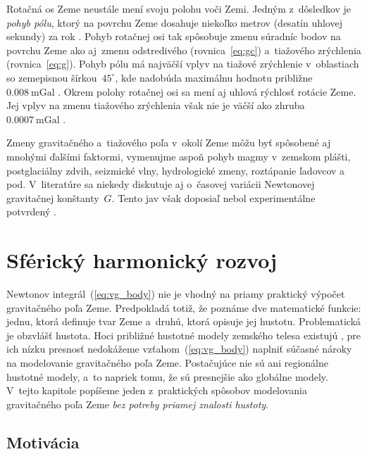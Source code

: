 \documentclass[a4paper, 12pt]{book}
\begin{document}
Rotačná os Zeme neustále mení svoju polohu voči Zemi.  Jedným z~dôsledkov je 
\emph{pohyb pólu}, ktorý na povrchu Zeme dosahuje niekoľko metrov (desatín 
uhlovej sekundy) za rok \parencite{MoritzPhysicalGeodesy}.  Pohyb rotačnej osi 
tak spôsobuje zmenu súradníc bodov na povrchu Zeme ako aj~zmenu odstredivého 
(rovnica~\ref{eq:gc}) a~tiažového zrýchlenia (rovnica~\ref{eq:g}).  Pohyb pólu 
má najväčší vplyv na tiažové zrýchlenie v~oblastiach so zemepisnou 
šírkou~$45^{\circ}$, kde nadobúda maximálnu hodnotu približne~$0.008\ 
\mathrm{mGal}$ \parencite{Torge1989}.  Okrem polohy rotačnej osi sa mení aj 
uhlová rýchlosť rotácie Zeme.  Jej vplyv na zmenu tiažového zrýchlenia však nie 
je väčší ako zhruba~$0.0007\ \mathrm{mGal}$ \parencite{Torge1989}.

Zmeny gravitačného a~tiažového poľa v~okolí Zeme môžu byť spôsobené aj mnohými 
ďalšími faktormi, vymenujme aspoň pohyb magmy v~zemskom plášti, postglaciálny 
zdvih, seizmické vlny, hydrologické zmeny, roztápanie ľadovcov a pod.  
V~literatúre sa niekedy diskutuje aj o~časovej variácii Newtonovej gravitačnej 
konštanty~$G$.  Tento jav však doposiaľ nebol experimentálne potvrdený 
\parencite{Torge1989}.







\chapter{Sférický harmonický rozvoj}
\label{sec:spherical_harmonic_expansion}

Newtonov integrál~(\ref{eq:vg_body}) nie je vhodný na priamy praktický výpočet 
gravitačného poľa Zeme.  Predpokladá totiž, že poznáme dve matematické funkcie: 
jednu, ktorá definuje tvar Zeme a~druhú, ktorá opisuje jej hustotu.  
Problematická je obzvlášť hustota.  Hoci približné hustotné modely zemského 
telesa existujú \parencite[napríklad][]{Dziewonski1981}, pre ich nízku presnosť 
nedokážeme vzťahom~(\ref{eq:vg_body}) naplniť súčasné nároky na modelovanie 
gravitačného poľa Zeme.  Postačujúce nie sú ani regionálne hustotné modely, 
a~to napriek tomu, že sú presnejšie ako globálne modely.  V~tejto kapitole 
popíšeme jeden z~praktických spôsobov modelovania gravitačného poľa Zeme 
\emph{bez potreby priamej znalosti hustoty}.






\section{Motivácia}
\label{sec:sh_motivation}
\end{document}
